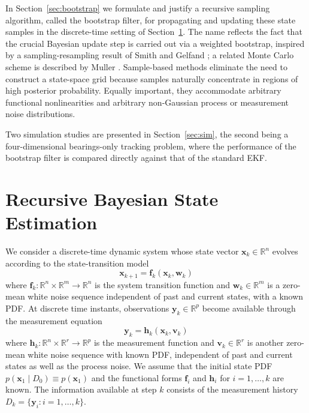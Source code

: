 In Section~\ref{sec:bootstrap} we formulate and justify a recursive sampling algorithm, called the bootstrap filter, for propagating and updating these state samples in the discrete-time setting of Section~\ref{sec:bayes}. The name reflects the fact that the crucial Bayesian update step is carried out via a weighted bootstrap, inspired by a sampling-resampling result of Smith and Gelfand \cite{r14}; a related Monte Carlo scheme is described by Muller \cite{r12}. Sample-based methods eliminate the need to construct a state-space grid because samples naturally concentrate in regions of high posterior probability. Equally important, they accommodate arbitrary functional nonlinearities and arbitrary non-Gaussian process or measurement noise distributions.

Two simulation studies are presented in Section~\ref{sec:sim}, the second being a four-dimensional bearings-only tracking problem, where the performance of the bootstrap filter is compared directly against that of the standard EKF.

\section{Recursive Bayesian State Estimation}\label{sec:bayes}

We consider a discrete-time dynamic system whose state vector $\bm{x}_k \in \mathbb{R}^n$ evolves according to the state-transition model
\begin{equation}\label{eq:1}
\bm{x}_{k+1} = \bm{f}_k(\bm{x}_k, \bm{w}_k)
\end{equation}
where $\bm{f}_k : \mathbb{R}^n \times \mathbb{R}^m \to \mathbb{R}^n$ is the system transition function and $\bm{w}_k \in \mathbb{R}^m$ is a zero-mean white noise sequence independent of past and current states, with a known PDF. At discrete time instants, observations $\bm{y}_k \in \mathbb{R}^p$ become available through the measurement equation
\begin{equation}\label{eq:2}
\bm{y}_k = \bm{h}_k(\bm{x}_k, \bm{v}_k)
\end{equation}
where $\bm{h}_k : \mathbb{R}^n \times \mathbb{R}^r \to \mathbb{R}^p$ is the measurement function and $\bm{v}_k \in \mathbb{R}^r$ is another zero-mean white noise sequence with known PDF, independent of past and current states as well as the process noise. We assume that the initial state PDF $p(\bm{x}_1 \mid D_0) \equiv p(\bm{x}_1)$ and the functional forms $\bm{f}_i$ and $\bm{h}_i$ for $i = 1, \dots, k$ are known. The information available at step $k$ consists of the measurement history $D_k = \{\bm{y}_i : i = 1, \dots, k\}$.

